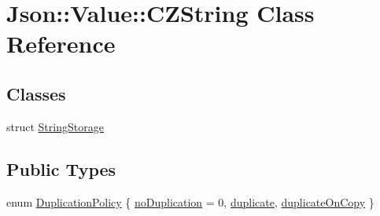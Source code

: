 \hypertarget{classJson_1_1Value_1_1CZString}{}\section{Json\+:\+:Value\+:\+:C\+Z\+String Class Reference}
\label{classJson_1_1Value_1_1CZString}
\subsection*{Classes}
\begin{DoxyCompactItemize}
\item 
struct \hyperlink{structJson_1_1Value_1_1CZString_1_1StringStorage}{String\+Storage}
\end{DoxyCompactItemize}
\subsection*{Public Types}
\begin{DoxyCompactItemize}
\item 
enum \hyperlink{classJson_1_1Value_1_1CZString_a2805c46fb4a72bbaed55de6d75941b6d}{Duplication\+Policy} \{ \hyperlink{classJson_1_1Value_1_1CZString_a2805c46fb4a72bbaed55de6d75941b6da08d540450fa6c4af57eaacf063eedd20}{no\+Duplication} = 0, 
\hyperlink{classJson_1_1Value_1_1CZString_a2805c46fb4a72bbaed55de6d75941b6dabb2134294dd8fc37dd82d18bb794fe20}{duplicate}, 
\hyperlink{classJson_1_1Value_1_1CZString_a2805c46fb4a72bbaed55de6d75941b6da5c18c35205a3be63ad14ce659e70fe7d}{duplicate\+On\+Copy}
 \}
\end{DoxyCompactItemize}
